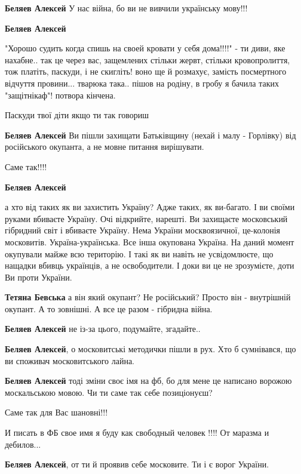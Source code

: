\begin{itemize}
\begin{itemize}
\textbf{Беляев Алексей} У нас війна, бо ви не вивчили українську мову!!!

\textbf{Беляев Алексей} 

"Хорошо судить когда спишь на своей кровати у себя дома!!!!" - ти диви, яке
нахабне.. так це через вас, защемлених стільки жервт, стільки кровопролиття, тож
платіть, паскуди, і не скигліть! воно ще й розмахує, замість посмертного
відчуття провини... тварюка така.. пішов на родіну, в гробу я бачила таких
"защітнікаф"! потвора кінчена.

Паскуди твої діти якщо ти так говориш

\textbf{Беляев Алексей} Ви пішли захищати Батьківщину (нехай і малу - Горлівку) від російського окупанта, а не мовне питання вирішувати.

Саме так!!!!

\textbf{Беляев Алексей} 

а хто від таких як ви захистить Україну? Адже таких, як ви-багато. І ви своїми
руками вбиваєте Україну. Очі відкрийте, нарешті. Ви захищаєте московський
гібридний світ і вбиваєте Україну. Нема України москвоязичної, це-колонія
московитів. Україна-українська. Все інша окупована Україна. На даний момент
окупували майже всю територію. І такі як ви навіть не усвідомлюєте, що нащадки
вбивць українців, а не освободители. І доки ви це не зрозумієте, доти Ви проти
України.

\textbf{Тетяна Бевська} а він який окупант? Не російський? Просто він - внутрішній окупант. А то зовнішні. А все це разом - гібридна війна.

\textbf{Беляев Алексей} не із-за цього, подумайте, згадайте..

\textbf{Беляев Алексей}, о московитські методички пішли в рух. Хто б сумнівався, що ви споживач московитського лайна.

\textbf{Беляев Алексей} тоді зміни своє імя на фб, бо для мене це написано ворожою москальською мовою. Чи ти саме так себе позиціонуєш?

Саме так для Вас шановні!!!

И писать в ФБ свое имя я буду как свободный человек !!!! От маразма и дебилов...

\textbf{Беляев Алексей}, от ти й проявив себе московите. Ти і є ворог України.


\end{itemize}
\end{itemize}
